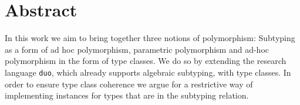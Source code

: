 \documentclass[twoside,12pt,a4paper]{report}
\begin{document}

\setcounter{page}{1}



\section*{Abstract}

In this work we aim to bring together three notions of polymorphism:
Subtyping as a form of ad hoc polymorphism, parametric polymorphism and ad-hoc polymorphism in the form  of type classes.
We do so by extending the research language \texttt{duo}, which already supports algebraic subtyping, with type classes.
In order to ensure type class coherence we argue for a restrictive way of implementing instances for types that are in the subtyping relation.



\cleardoublepage


\renewcommand{\baselinestretch}{1.3}
\small\normalsize

\tableofcontents

\renewcommand{\baselinestretch}{1}
\small\normalsize

\cleardoublepage


\setcounter{page}{1}


\cleardoublepage


\cleardoublepage
\end{document}
